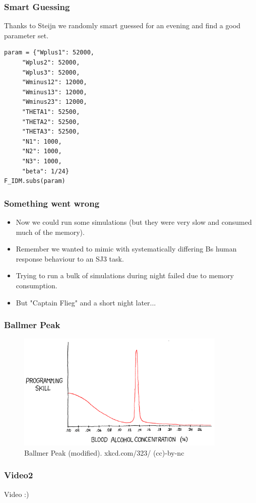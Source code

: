 \documentclass[xcolor={fixpdftex,hyperref,x11names},10pt,pdftex,hyperref={pdftex}]{beamer}
\begin{document}
\begin{frame}[fragile]
  \frametitle{Smart Guessing}
  Thanks to Steijn we randomly smart guessed for an evening and find a good
  parameter set.
  \begin{verbatim}
param = {"Wplus1": 52000,
     "Wplus2": 52000,
     "Wplus3": 52000,
     "Wminus12": 12000,
     "Wminus13": 12000,
     "Wminus23": 12000,
     "THETA1": 52500,
     "THETA2": 52500,
     "THETA3": 52500,
     "N1": 1000,
     "N2": 1000,
     "N3": 1000,
     "beta": 1/24}
F_IDM.subs(param)
  \end{verbatim}
\end{frame}

\begin{frame}
  \frametitle{Something went wrong}
  \begin{itemize}
      \item Now we could run some simulations (but they were very slow and
          consumed much of the memory).
      \item Remember we wanted to mimic with systematically differing Bs
          human response behaviour to an SJ3 task.
      \item Trying to run a bulk of simulations during night failed due to
          memory consumption.
      \item But "Captain Flieg" and a short night later...
  \end{itemize}
\end{frame}

\begin{frame}
  \frametitle{Ballmer Peak}
  \begin{figure}[h]
      \includegraphics[width=100mm]{figs/ballmer_peak_mod.png}
      \caption{Ballmer Peak (modified). xkcd.com/323/ (cc)-by-nc}
  \end{figure}
\end{frame}

\begin{frame}
  \frametitle{Video2}
  Video :)
\end{frame}
\end{document}
